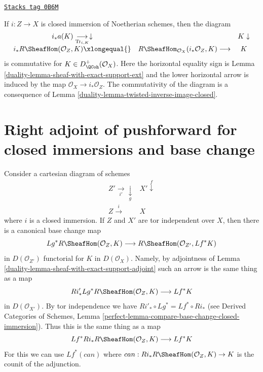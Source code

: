 \begin{example}
\label{duality-example-trace-closed-immersion}
\href{https://stacks.math.columbia.edu/tag/0B6M}{\texttt{Stacks tag 0B6M}}

If $i : Z \to X$ is closed immersion of Noetherian schemes, then
the diagram
$$
\begin{array}{ccc}i_*a(K) \underset{\text{Tr}_{i, K}}{\longrightarrow}\downarrow &  & K \downarrow \\ i_*R\SheafHom(\mathcal{O}_Z, K) \xlongequal{} & R\SheafHom_{\mathcal{O}_X}(i_*\mathcal{O}_Z, K)
\longrightarrow & K\end{array}
$$
is commutative for $K \in D_\QCoh^+(\mathcal{O}_X)$.
Here the horizontal equality sign is
Lemma \ref{duality-lemma-sheaf-with-exact-support-ext} and the
lower horizontal arrow is induced
by the map $\mathcal{O}_X \to i_*\mathcal{O}_Z$. The commutativity
of the diagram is a consequence of
Lemma \ref{duality-lemma-twisted-inverse-image-closed}.
\end{example}

\section{Right adjoint of pushforward for closed immersions and base change}
\label{duality-section-sections-with-exact-support-base-change}
Consider a cartesian diagram of schemes
$$
\begin{array}{cc}Z' \underset{i'}{\longrightarrow}\underset{g}{\downarrow} & X' \overset{f}{\downarrow} \\ Z \overset{i}{\longrightarrow} & X\end{array}
$$
where $i$ is a closed immersion. If $Z$ and $X'$ are
tor independent over $X$, then there is a canonical
base change map
\begin{equation}
\label{equation-base-change-exact-support}
Lg^*R\SheafHom(\mathcal{O}_Z, K)
\longrightarrow
R\SheafHom(\mathcal{O}_{Z'}, Lf^*K)
\end{equation}
in $D(\mathcal{O}_{Z'})$ functorial for $K$ in $D(\mathcal{O}_X)$.
Namely, by adjointness of Lemma \ref{duality-lemma-sheaf-with-exact-support-adjoint}
such an arrow is the same thing as a map
$$
Ri'_*Lg^*R\SheafHom(\mathcal{O}_Z, K)
\longrightarrow
Lf^*K
$$
in $D(\mathcal{O}_{X'})$. By tor independence we have
$Ri'_* \circ Lg^* = Lf^* \circ Ri_*$ (see
Derived Categories of Schemes, Lemma
\ref{perfect-lemma-compare-base-change-closed-immersion}).
Thus this is the same thing as a map
$$
Lf^*Ri_*R\SheafHom(\mathcal{O}_Z, K)
\longrightarrow
Lf^*K
$$
For this we can use $Lf^*(can)$ where
$can : Ri_* R\SheafHom(\mathcal{O}_Z, K) \to K$ is the
counit of the adjunction.

